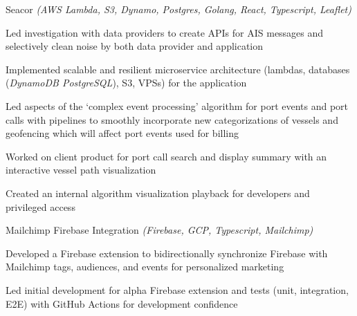 \begin{cventries}
  \cvcustombody
      {Seacor \emph{(AWS Lambda, S3, Dynamo, Postgres, Golang, React, Typescript, Leaflet)}}
      {
      \begin{cvitems} %
        \item {Led investigation with data providers to create APIs for AIS messages and selectively clean noise by both data provider and application}
        \item {Implemented scalable and resilient microservice architecture (lambdas, databases (\emph{DynamoDB \rightarrow PostgreSQL}), S3, VPSs) for the application}
        \item {Led aspects of the `complex event processing' algorithm for port events and port calls with pipelines to smoothly incorporate new categorizations of vessels and geofencing which will affect port events used for billing}
        \item {Worked on client product for port call search and display summary with an interactive vessel path visualization}
        \item {Created an internal algorithm visualization playback for developers and privileged access}
      \end{cvitems}
    }

  \cvcustombody
      {Mailchimp Firebase Integration \emph{(Firebase, GCP, Typescript, Mailchimp)}}
      {
      \begin{cvitems} %
        \item {Developed a Firebase extension to bidirectionally synchronize Firebase with Mailchimp tags, audiences, and events for personalized marketing}
        \item {Led initial development for alpha Firebase extension and tests (unit, integration, E2E) with GitHub Actions for development confidence}
      \end{cvitems}
    }

\end{cventries}
